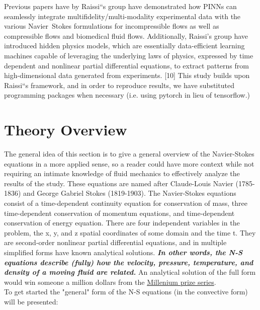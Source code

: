 \documentclass{article}
\begin{document}
Previous papers have by Raissi``s group have demonstrated how PINNs can
seamlessly integrate multifidelity/multi-modality experimental data with the
various Navier~Stokes formulations for incompressible flows
\cite{DBLP:journals/corr/abs-1711-10561,DBLP:journals/corr/abs-1711-10566} as
well as compressible flows \cite{physics-informed-machine-learning} and
biomedical fluid flows. Additionally, Raissi’s group have introduced hidden
physics models, which are essentially data-efficient learning machines capable
of leveraging the underlying laws of physics, expressed by time dependent and
nonlinear partial differential equations, to extract patterns from
high-dimensional data generated from experiments. [10]
This study builds upon Raissi``s framework, and in order to reproduce
results, we have substituted programming packages when necessary (i.e. using
pytorch in lieu of tensorflow.)

\section{Theory Overview} \label{theory}

The general idea of this section is to give a general overview of the
Navier-Stokes equations in a more applied sense, so a reader could have more
context while not requiring an intimate knowledge of fluid mechanics to
effectively analyze the results of the study. These equations are named after
Claude-Louis Navier (1785-1836) and George Gabriel Stokes (1819-1903). The
Navier-Stokes equations consist of a time-dependent continuity equation for
conservation of mass, three time-dependent conservation of momentum equations,
and time-dependent conservation of energy equation. There are four independent
variables in the problem, the x, y, and z spatial coordinates of some domain
and the time t.\cite{NASA} They are second-order nonlinear partial differential
equations, and in multiple simplified forms have known analytical solutions.
\textit{\textbf{In other words, the N-S equations describe (fully) how the
		velocity, pressure, temperature, and density of a moving fluid
		are related.}}
An analytical solution of the full form would win someone a million dollars
from the
\href{https://www.claymath.org/millennium-problems/navier%E2%80%93stokes-equationURL}{Millenium prize series}. \\


\noindent To get started the "general" form of the N-S equations (in
the convective form) will be presented:
\end{document}
